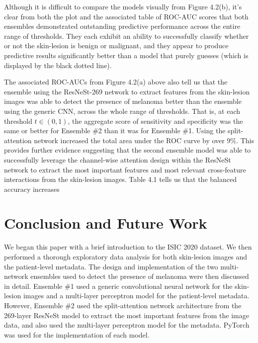 \documentclass [MAS] {uclathes}
\begin{document}
Although it is difficult to compare the models visually from Figure 4.2(b), it's clear from both the plot and the associated table of ROC-AUC scores that both ensembles demonstrated outstanding predictive performance across the entire range of thresholds. They each exhibit an ability to successfully classify whether or not the skin-lesion is benign or malignant, and they appear to produce predictive results significantly better than a model that purely guesses (which is displayed by the black dotted line).

The associated ROC-AUCs from Figure 4.2(a) above also tell us that the ensemble using the ResNeSt-269 network to extract features from the skin-lesion images was able to detect the presence of melanoma better than the ensemble using the generic CNN, across the whole range of thresholds. That is, at each threshold $t \in (0, 1)$, the aggregate score of sensitivity and specificity was the same or better for Ensemble \#2 than it was for Ensemble \#1. Using the split-attention network increased the total area under the ROC curve by over 9\%. This provides further evidence suggesting that the second ensemble model was able to successfully leverage the channel-wise attention design within the ResNeSt network to extract the most important features and most relevant cross-feature interactions from the skin-lesion images. Table 4.1 tells us that the balanced accuracy increases 

\chapter{Conclusion and Future Work}

We began this paper with a brief introduction to the ISIC 2020 dataset. We then performed a thorough exploratory data analysis for both skin-lesion images and the patient-level metadata. The design and implementation of the two multi-network ensembles used to detect the presence of melanoma were then discussed in detail. Ensemble \#1 used a generic convolutional neural network for the skin-lesion images and a multi-layer perceptron model for the patient-level metadata. However, Ensemble \#2 used the split-attention network architecture from the 269-layer ResNeSt model to extract the most important features from the image data, and also used the multi-layer perceptron model for the metadata. PyTorch was used for the implementation of each model.
\end{document}
